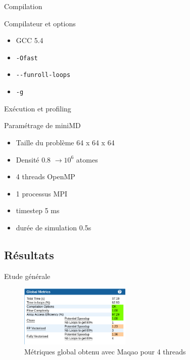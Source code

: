 \documentclass[9.5pt]{beamer}
\begin{document}
		\begin{frame}{Compilation}
			\begin{block}{Compilateur et options}
				\begin{itemize}
					\item GCC 5.4
					\item \verb!-Ofast!
					\item \verb!--funroll-loops!
					\item \verb!-g!
				\end{itemize}
			\end{block}
		\end{frame}

		\begin{frame}{Exécution et profiling}
			\begin{block}{Paramétrage de miniMD}
				\begin{itemize}
					\item Taille du problème 64 x 64 x 64
					\item Densité 0.8 $\rightarrow 10^6$ atomes
					\item 4 threads OpenMP
					\item 1 processus MPI
					\item timestep 5 ms
					\item durée de simulation 0.5s
				\end{itemize}
			\end{block}
		\end{frame}

	\subsection{Résultats}
		\begin{frame}{Etude générale}
			
			\begin{figure}[h!]
				\centering
				\begin{center}
					\includegraphics[width=200px]{images/maqao_global_metrics.png}
					\caption{Métriques global obtenu avec Maqao pour 4 threads}
					\label{global_maqao}
				\end{center}
			\end{figure}
		\end{frame}
\end{document}
